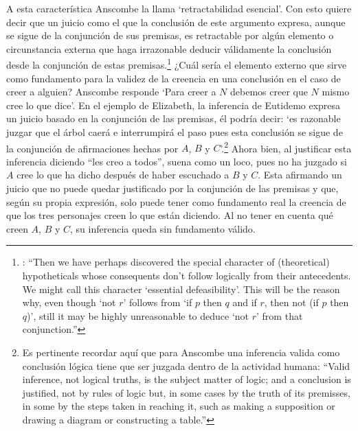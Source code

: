 A esta característica Anscombe la llama `retractabilidad esencial'. Con esto quiere decir que un juicio como el que la conclusión de este argumento expresa, aunque se sigue de la conjunción de sus premisas, es retractable por algún elemento o circunstancia externa que haga irrazonable deducir válidamente la conclusión desde la conjunción de estas premisas.\footnote{\cite[Cf.~][299]{anscombe2015logic:qpa}: \enquote{Then we have perhaps discovered the special character of (theoretical) hypotheticals whose consequents don't follow logically from their antecedents. We might call this character `essential defeasibility'. This will be the reason why, even though `not $r$' follows from `if $p$ then $q$ and if $r$, then not (if $p$ then $q$)', still it may be highly unreasonable to deduce `not $r$' from that conjunction.}} ¿Cuál sería el elemento externo que sirve como fundamento para la validez de la creencia en una conclusión en el caso de creer a alguien? Anscombe responde \enquote*{Para creer a $N$ debemos creer que $N$ mismo cree lo que dice}. En el ejemplo de Elizabeth, la inferencia de Eutidemo expresa un juicio basado en la conjunción de las premisas, él podría decir: \enquote*{es razonable juzgar que el árbol caerá e interrumpirá el paso pues esta conclusión se sigue de la conjunción de afirmaciones hechas por $A$, $B$ y $C$}.\footnote{Es pertinente recordar aquí que para Anscombe una inferencia valida como conclusión lógica tiene que ser juzgada dentro de la actividad humana: \cite[121]{anscombe1981parmenides:qli} \enquote{Valid inference, not logical truths, is the subject matter of logic; and a conclusion is justified, not by rules of logic but, in some cases by the truth of its premisses, in some by the steps taken in reaching it, such as making a supposition or drawing a diagram or constructing a table.}} Ahora bien, al justificar esta inferencia diciendo \enquote{les creo a todos}, suena como un loco, pues no ha juzgado si $A$ cree lo que ha dicho después de haber escuchado a $B$ y $C$. Esta afirmando un juicio que no puede quedar justificado por la conjunción de las premisas y que, según su propia expresión, solo puede tener como fundamento real la creencia de que los tres personajes creen lo que están diciendo. Al no tener en cuenta qué creen $A$, $B$ y $C$, su inferencia queda sin fundamento válido.

